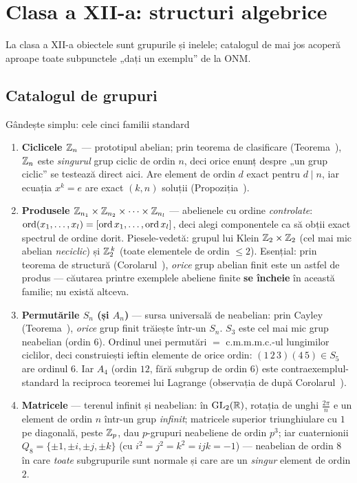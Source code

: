 \section{Clasa a XII-a: structuri algebrice}

La clasa a XII-a obiectele sunt grupurile și inelele; catalogul de mai jos acoperă aproape toate subpunctele „dați un exemplu'' de la ONM.

\subsection{Catalogul de grupuri}

\begin{tehbox}{Gândește simplu: cele cinci familii standard}
\begin{enumerate}[leftmargin=*, itemsep=2pt]
\item \textbf{Ciclicele $\mathbb{Z}_n$} --- prototipul abelian; prin teorema de clasificare (Teorema~), $\mathbb{Z}_n$ este \emph{singurul} grup ciclic de ordin $n$, deci orice enunț despre „un grup ciclic'' se testează direct aici. Are element de ordin $d$ exact pentru $d\mid n$, iar ecuația $x^k=e$ are exact $(k,n)$ soluții (Propoziția~).
\item \textbf{Produsele $\mathbb{Z}_{n_1}\times\mathbb{Z}_{n_2}\times\dots\times\mathbb{Z}_{n_l}$} --- abelienele cu ordine \emph{controlate}: $\operatorname{ord}(x_1,\dots,x_l)=[\operatorname{ord} x_1,\dots,\operatorname{ord} x_l]$, deci alegi componentele ca să obții exact spectrul de ordine dorit. Piesele-vedetă: grupul lui Klein $\mathbb{Z}_2\times\mathbb{Z}_2$ (cel mai mic abelian \emph{neciclic}) și $\mathbb{Z}_2^{\,k}$ (toate elementele de ordin $\le2$). Esențial: prin teorema de structură (Corolarul~), \emph{orice} grup abelian finit este un astfel de produs --- căutarea printre exemplele abeliene finite \textbf{se încheie} în această familie; nu există altceva.
\item \textbf{Permutările $S_n$ (și $A_n$)} --- sursa universală de neabelian: prin Cayley (Teorema~), \emph{orice} grup finit trăiește într-un $S_n$. $S_3$ este cel mai mic grup neabelian (ordin $6$). Ordinul unei permutări $=$ c.m.m.m.c.-ul lungimilor ciclilor, deci construiești ieftin elemente de orice ordin: $(1\,2\,3)(4\,5)\in S_5$ are ordinul $6$. Iar $A_4$ (ordin $12$, fără subgrup de ordin $6$) este contraexemplul-standard la reciproca teoremei lui Lagrange (observația de după Corolarul~).
\item \textbf{Matricele} --- terenul infinit și neabelian: în $\mathrm{GL}_2(\mathbb{R})$, rotația de unghi $\frac{2\pi}{n}$ e un element de ordin $n$ într-un grup \emph{infinit}; matricele superior triunghiulare cu $1$ pe diagonală, peste $\mathbb{Z}_p$, dau $p$-grupuri neabeliene de ordin $p^3$; iar cuaternionii $Q_8=\{\pm1,\pm i,\pm j,\pm k\}$ (cu $i^2=j^2=k^2=ijk=-1$) --- neabelian de ordin $8$ în care \emph{toate} subgrupurile sunt normale și care are un \emph{singur} element de ordin $2$.

\end{enumerate}
\end{tehbox}
